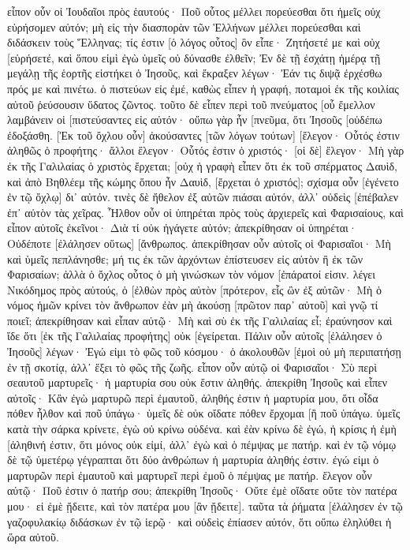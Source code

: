 εἶπον οὖν οἱ Ἰουδαῖοι πρὸς ἑαυτούς· Ποῦ οὗτος μέλλει πορεύεσθαι ὅτι ἡμεῖς οὐχ εὑρήσομεν αὐτόν; μὴ εἰς τὴν διασπορὰν τῶν Ἑλλήνων μέλλει πορεύεσθαι καὶ διδάσκειν τοὺς Ἕλληνας; 
τίς ἐστιν [ὁ λόγος οὗτος] ὃν εἶπε· Ζητήσετέ με καὶ οὐχ [εὑρήσετέ, καὶ ὅπου εἰμὶ ἐγὼ ὑμεῖς οὐ δύνασθε ἐλθεῖν; 
Ἐν δὲ τῇ ἐσχάτῃ ἡμέρᾳ τῇ μεγάλῃ τῆς ἑορτῆς εἱστήκει ὁ Ἰησοῦς, καὶ ἔκραξεν λέγων· Ἐάν τις διψᾷ ἐρχέσθω πρός με καὶ πινέτω. 
ὁ πιστεύων εἰς ἐμέ, καθὼς εἶπεν ἡ γραφή, ποταμοὶ ἐκ τῆς κοιλίας αὐτοῦ ῥεύσουσιν ὕδατος ζῶντος. 
τοῦτο δὲ εἶπεν περὶ τοῦ πνεύματος [οὗ ἔμελλον λαμβάνειν οἱ [πιστεύσαντες εἰς αὐτόν· οὔπω γὰρ ἦν [πνεῦμα, ὅτι Ἰησοῦς [οὐδέπω ἐδοξάσθη. 
[Ἐκ τοῦ ὄχλου οὖν] ἀκούσαντες [τῶν λόγων τούτων] [ἔλεγον· Οὗτός ἐστιν ἀληθῶς ὁ προφήτης· 
ἄλλοι ἔλεγον· Οὗτός ἐστιν ὁ χριστός· [οἱ δὲ] ἔλεγον· Μὴ γὰρ ἐκ τῆς Γαλιλαίας ὁ χριστὸς ἔρχεται; 
[οὐχ ἡ γραφὴ εἶπεν ὅτι ἐκ τοῦ σπέρματος Δαυὶδ, καὶ ἀπὸ Βηθλέεμ τῆς κώμης ὅπου ἦν Δαυὶδ, [ἔρχεται ὁ χριστός]; 
σχίσμα οὖν [ἐγένετο ἐν τῷ ὄχλῳ] δι᾽ αὐτόν. 
τινὲς δὲ ἤθελον ἐξ αὐτῶν πιάσαι αὐτόν, ἀλλ᾽ οὐδεὶς [ἐπέβαλεν ἐπ᾽ αὐτὸν τὰς χεῖρας. 
Ἦλθον οὖν οἱ ὑπηρέται πρὸς τοὺς ἀρχιερεῖς καὶ Φαρισαίους, καὶ εἶπον αὐτοῖς ἐκεῖνοι· Διὰ τί οὐκ ἠγάγετε αὐτόν; 
ἀπεκρίθησαν οἱ ὑπηρέται· Οὐδέποτε [ἐλάλησεν οὕτως] [ἄνθρωπος. 
ἀπεκρίθησαν οὖν αὐτοῖς οἱ Φαρισαῖοι· Μὴ καὶ ὑμεῖς πεπλάνησθε; 
μή τις ἐκ τῶν ἀρχόντων ἐπίστευσεν εἰς αὐτὸν ἢ ἐκ τῶν Φαρισαίων; 
ἀλλὰ ὁ ὄχλος οὗτος ὁ μὴ γινώσκων τὸν νόμον [ἐπάρατοί εἰσιν. 
λέγει Νικόδημος πρὸς αὐτούς, ὁ [ἐλθὼν πρὸς αὐτὸν [πρότερον, εἷς ὢν ἐξ αὐτῶν· 
Μὴ ὁ νόμος ἡμῶν κρίνει τὸν ἄνθρωπον ἐὰν μὴ ἀκούσῃ [πρῶτον παρ᾽ αὐτοῦ] καὶ γνῷ τί ποιεῖ; 
ἀπεκρίθησαν καὶ εἶπαν αὐτῷ· Μὴ καὶ σὺ ἐκ τῆς Γαλιλαίας εἶ; ἐραύνησον καὶ ἴδε ὅτι [ἐκ τῆς Γαλιλαίας προφήτης] οὐκ [ἐγείρεται. 
Πάλιν οὖν αὐτοῖς [ἐλάλησεν ὁ Ἰησοῦς] λέγων· Ἐγώ εἰμι τὸ φῶς τοῦ κόσμου· ὁ ἀκολουθῶν [ἐμοὶ οὐ μὴ περιπατήσῃ ἐν τῇ σκοτίᾳ, ἀλλ᾽ ἕξει τὸ φῶς τῆς ζωῆς. 
εἶπον οὖν αὐτῷ οἱ Φαρισαῖοι· Σὺ περὶ σεαυτοῦ μαρτυρεῖς· ἡ μαρτυρία σου οὐκ ἔστιν ἀληθής. 
ἀπεκρίθη Ἰησοῦς καὶ εἶπεν αὐτοῖς· Κἂν ἐγὼ μαρτυρῶ περὶ ἐμαυτοῦ, ἀληθής ἐστιν ἡ μαρτυρία μου, ὅτι οἶδα πόθεν ἦλθον καὶ ποῦ ὑπάγω· ὑμεῖς δὲ οὐκ οἴδατε πόθεν ἔρχομαι [ἢ ποῦ ὑπάγω. 
ὑμεῖς κατὰ τὴν σάρκα κρίνετε, ἐγὼ οὐ κρίνω οὐδένα. 
καὶ ἐὰν κρίνω δὲ ἐγώ, ἡ κρίσις ἡ ἐμὴ [ἀληθινή ἐστιν, ὅτι μόνος οὐκ εἰμί, ἀλλ᾽ ἐγὼ καὶ ὁ πέμψας με πατήρ. 
καὶ ἐν τῷ νόμῳ δὲ τῷ ὑμετέρῳ γέγραπται ὅτι δύο ἀνθρώπων ἡ μαρτυρία ἀληθής ἐστιν. 
ἐγώ εἰμι ὁ μαρτυρῶν περὶ ἐμαυτοῦ καὶ μαρτυρεῖ περὶ ἐμοῦ ὁ πέμψας με πατήρ. 
ἔλεγον οὖν αὐτῷ· Ποῦ ἐστιν ὁ πατήρ σου; ἀπεκρίθη Ἰησοῦς· Οὔτε ἐμὲ οἴδατε οὔτε τὸν πατέρα μου· εἰ ἐμὲ ᾔδειτε, καὶ τὸν πατέρα μου [ἂν ᾔδειτε]. 
ταῦτα τὰ ῥήματα [ἐλάλησεν ἐν τῷ γαζοφυλακίῳ διδάσκων ἐν τῷ ἱερῷ· καὶ οὐδεὶς ἐπίασεν αὐτόν, ὅτι οὔπω ἐληλύθει ἡ ὥρα αὐτοῦ. 
